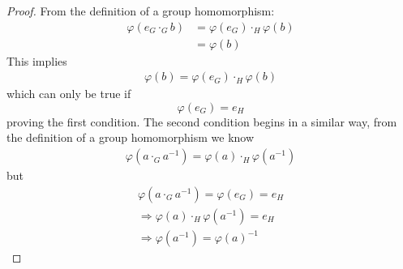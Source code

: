 \documentclass{article}
\theoremstyle{definition}
\theoremstyle{remark}
\begin{document}
\begin{proof}
	From the definition of a group homomorphism:
	\begin{align*}
		\varphi(e_G\cdot_Gb) & =\varphi(e_G)\cdot_H\varphi(b) \\
		                     & =\varphi(b)
	\end{align*}
	This implies
	\begin{align*}
		\varphi(b)=\varphi(e_G)\cdot_H\varphi(b)
	\end{align*}
	which can only be true if
	\begin{equation}
		\varphi(e_G)=e_H
	\end{equation}
	proving the first condition. The second condition begins in a similar way, from the definition of a group homomorphism we know
	\begin{align*}
		\varphi(a\cdot_G a^{-1})=\varphi(a)\cdot_H\varphi(a^{-1})
	\end{align*}
	but
	\begin{align*}
		\varphi(a\cdot_Ga^{-1})=\varphi(e_G)=e_H         \\
		\Rightarrow \varphi(a)\cdot_H\varphi(a^{-1})=e_H \\
		\Rightarrow \varphi(a^{-1})=\varphi(a)^{-1}
	\end{align*}
\end{proof}
\end{document}
